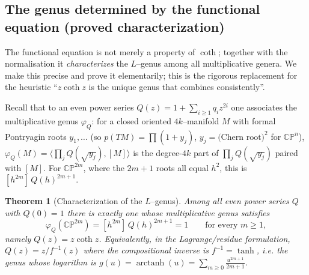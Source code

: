 \documentclass[12pt]{article}
\newtheorem{theorem}{Theorem}
\theoremstyle{definition}
\begin{document}
\subsection*{The genus determined by the functional equation (proved characterization)}

The functional equation is not merely a property of $\coth$; together with the
normalisation it \emph{characterizes} the $L$--genus among all multiplicative genera. We
make this precise and prove it elementarily; this is the rigorous replacement for the
heuristic ``$z\coth z$ is the unique genus that combines consistently''.

Recall that to an even power series $Q(z)=1+\sum_{i\ge1}q_iz^{2i}$ one associates the
multiplicative genus $\varphi_Q$: for a closed oriented $4k$--manifold $M$ with formal
Pontryagin roots $y_1,\dots$ (so $p(TM)=\prod(1+y_j)$, $y_j=\text{(Chern root)}^2$ for
$\mathbb{CP}^n$), $\varphi_Q(M)=\big\langle\prod_jQ(\sqrt{y_j}),[M]\big\rangle$ is the
degree-$4k$ part of $\prod_jQ(\sqrt{y_j})$ paired with $[M]$. For $\mathbb{CP}^{2m}$,
where the $2m{+}1$ roots all equal $h^2$, this is $[h^{2m}]\,Q(h)^{2m+1}$.

\begin{theorem}[Characterization of the $L$--genus]\label{thm:char}
Among all even power series $Q$ with $Q(0)=1$ there is exactly one whose multiplicative
genus satisfies
\[
\varphi_Q(\mathbb{CP}^{2m})=[h^{2m}]\,Q(h)^{2m+1}=1
\qquad\text{for every }m\ge1,
\tag{12}\label{eq:normCP}
\]
namely $Q(z)=z\coth z$. Equivalently, in the Lagrange/residue formulation, $Q(z)=z/f^{-1}(z)$
where the compositional inverse is $f^{-1}=\tanh$, i.e. the genus whose logarithm is
$g(u)=\operatorname{arctanh}(u)=\sum_{m\ge0}\frac{u^{2m+1}}{2m+1}$.
\end{theorem}
\end{document}
